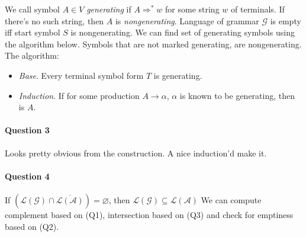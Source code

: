 We call symbol $A\in V$ \emph{generating} if $A\Rightarrow^* w$ for some string $w$ of terminals.
If there's no such string, then $A$ is \emph{nongenerating}.
Language of grammar $\mathcal{G}$ is empty iff start symbol $S$ is nongenerating.
We can find set of generating symbols using the algorithm below.
Symbols that are not marked generating, are nongenerating.
The algorithm:
\begin{itemize}
    \item \emph{Base}. Every terminal symbol form $T$ is generating.
    \item \emph{Induction}. If for some production $A\rightarrow \alpha$, $\alpha$ is known to be generating, then is $A$.
\end{itemize}

\paragraph{Question 3}
Looks pretty obvious from the construction.
A nice induction'd make it.

\paragraph{Question 4}
If $(\mathcal{L(G)}\cap \overline{\mathcal{L(A)}}) = \varnothing$, then $\mathcal{L(G)} \subseteq \mathcal{L(A)}$
We can compute complement based on (Q1), intersection based on (Q3) and check for emptiness based on (Q2).